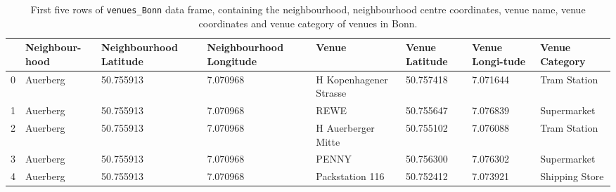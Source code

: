 \documentclass[UKenglish]{scrreprt}
\begin{document}
\begin{table}
	\caption{First five rows of \texttt{venues\_Bonn} data frame, containing the neighbourhood, neighbourhood centre coordinates, venue name, venue coordinates and venue category of venues in Bonn.}
	\label{tab:venues_Bonn}
\begin{tabular}{lp{1.5cm}p{2.2cm}p{2.2cm}p{1.5cm}p{1.5cm}p{1.5cm}p{1.5cm}}
	\toprule
	{} & Neighbour-hood &  Neighbourhood Latitude &  Neighbourhood Longitude &                   Venue &  Venue Latitude &  Venue Longi-tude &  Venue Category \\
	\midrule
	0 &     Auerberg &              50.755913 &                7.070968 &  H Kopenhagener Strasse &       50.757418 &         7.071644 &    Tram Station \\
	1 &     Auerberg &              50.755913 &                7.070968 &                    REWE &       50.755647 &         7.076839 &     Supermarket \\
	2 &     Auerberg &              50.755913 &                7.070968 &      H Auerberger Mitte &       50.755102 &         7.076088 &    Tram Station \\
	3 &     Auerberg &              50.755913 &                7.070968 &                   PENNY &       50.756300 &         7.076302 &     Supermarket \\
	4 &     Auerberg &              50.755913 &                7.070968 &         Packstation 116 &       50.752412 &         7.073921 &  Shipping Store \\
	\bottomrule
\end{tabular}
\end{table}
\end{document}
